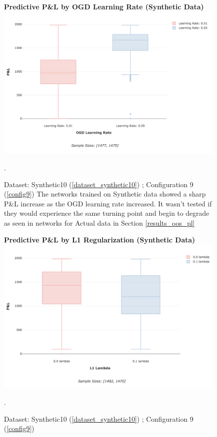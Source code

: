 \documentclass[a4paper,11pt,oneside]{article}
\theoremstyle{plain}
\theoremstyle{definition}
\begin{document}
	\begin{figure}[H]
		\centering 
		\textbf{Predictive P\&L by OGD Learning Rate (Synthetic Data)}
		\includegraphics[scale=0.3]{images/results/network/lr/synth_ogd_lr.png} 
		\caption[Predictive P\&L by OGD Learning Rate (Synthetic Data)]{Dataset: Synthetic10 (\ref{dataset_synthetic10}) ;  Configuration 9 (\ref{config9}) 
			\newline The networks trained on Synthetic data showed a sharp P\&L increase as the OGD learning rate increased. It wasn't tested if they would experience the same turning point and begin to degrade as seen in networks for Actual data in Section \ref{results_oos_pl}}.
		\label{figure-synth_ogd_lr}
	\end{figure}
	
	\begin{figure}[H]
		\centering 
		\textbf{Predictive P\&L by L1 Regularization (Synthetic Data)}
		\includegraphics[scale=0.3]{images/results/network/reg/synth_pl_reg.png} 
		\caption[Predictive P\&L by L1 Regularization (Synthetic Data)]{Dataset: Synthetic10 (\ref{dataset_synthetic10}) ; Configuration 9 (\ref{config9})  
			\newline }.
		\label{figure-synth_pl_reg}
	\end{figure}
	
\end{document}
